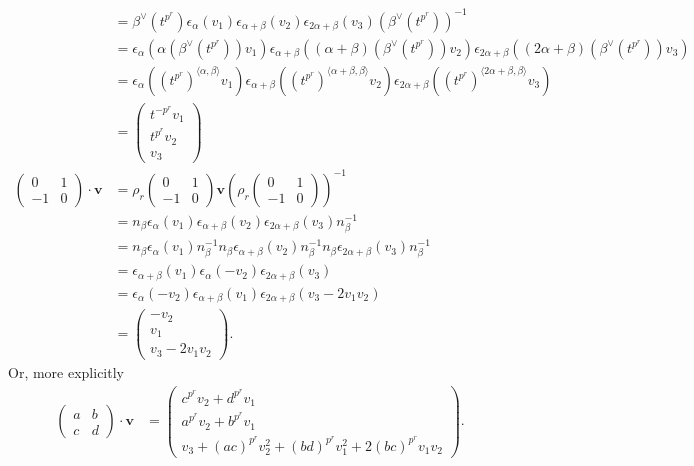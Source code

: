 \begin{align*}
&= \beta^\vee(t^{p^r}) \epsilon_\alpha (v_1)
\epsilon_{\alpha+\beta}(v_2)
\epsilon_{2\alpha+\beta}(v_3) (\beta^\vee(t^{p^r}))^{-1} \\
&= \epsilon_\alpha \left(\alpha(\beta^\vee(t^{p^r}))v_1\right)
\epsilon_{\alpha+\beta} \left((\alpha+\beta)(\beta^\vee(t^{p^r}))v_2 \right)
\epsilon_{2\alpha+\beta} \left((2\alpha+\beta)(\beta^\vee(t^{p^r}))v_3 \right)\\
&= \epsilon_\alpha \left((t^{p^r})^{\langle \alpha, \beta \rangle}v_1 \right)
\epsilon_{\alpha+\beta} \left((t^{p^r})^{\langle \alpha+\beta, \beta \rangle}v_2 \right)
\epsilon_{2\alpha+\beta} \left((t^{p^r})^{\langle 2\alpha+\beta, \beta \rangle}v_3 \right)\\
&= \left(\begin{matrix} t^{-p^r}v_1 \\ t^{p^r}v_2\\ v_3 \end{matrix}\right) \\
\left(\begin{matrix} 0 & 1 \\ -1 & 0 \end{matrix}\right) \cdot \mathbf{v} &=
\rho_r\left(\begin{matrix} 0 & 1 \\ -1 & 0\end{matrix}\right) \mathbf{v}\left( \rho_r\left(\begin{matrix} 0 & 1 \\ -1 & 0\end{matrix}\right)\right)^{-1} \\
&= n_\beta  \epsilon_\alpha (v_1)\epsilon_{\alpha+\beta}(v_2) \epsilon_{2\alpha+\beta}(v_3) n_\beta^{-1}\\
&= n_\beta  \epsilon_\alpha (v_1) n_\beta^{-1}n_\beta \epsilon_{\alpha+\beta}(v_2) n_\beta^{-1} n_\beta \epsilon_{2\alpha+\beta}(v_3) n_\beta^{-1}\\
&= \epsilon_{\alpha+\beta} (v_1) \epsilon_{\alpha}(-v_2)  \epsilon_{2\alpha+\beta}(v_3) \\
&=\epsilon_{\alpha}(-v_2)  \epsilon_{\alpha+\beta} (v_1)  \epsilon_{2\alpha+\beta}(v_3 - 2v_1v_2) \\
&= \left(\begin{matrix} -v_2 \\ v_1 \\ v_3 - 2v_1v_2 \end{matrix}\right).
\end{align*}
Or, more explicitly
\begin{align*}
\left(\begin{matrix}
a & b \\ c & d
\end{matrix} \right) \cdot \mathbf{v} &=
\left(\begin{matrix}
c^{p^r}v_2 + d^{p^r}v_1 \\
a^{p^r}v_2 + b^{p^r}v_1 \\
v_3 + (ac)^{p^r}v_2^2 + (bd)^{p^r}v_1^2 + 2(bc)^{p^r}v_1v_2
\end{matrix}\right).
\end{align*}

